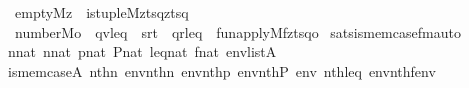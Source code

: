 \begin{isabellebody}
\ \ \ \ \ empty{\isacharparenleft}{\kern0pt}M{\isacharcomma}{\kern0pt}z{\isacharparenright}{\kern0pt}\ {\isasymand}\ is{\isacharunderscore}{\kern0pt}tuple{\isacharparenleft}{\kern0pt}M{\isacharcomma}{\kern0pt}z{\isacharcomma}{\kern0pt}t{}{\isacharcomma}{\kern0pt}s{\isacharcomma}{\kern0pt}q{\isacharcomma}{\kern0pt}zt{}sq{\isacharparenright}{\kern0pt}\ {\isasymand}\isanewline
\ \ \ \ \ number{}{\isacharparenleft}{\kern0pt}M{\isacharcomma}{\kern0pt}o{\isacharparenright}{\kern0pt}\ {\isasymand}\ qv{\isasymin}leq\ {\isasymand}\ sr{\isasymin}t{}\ {\isasymand}\ qr{\isasymin}leq\ {\isasymand}\ fun{\isacharunderscore}{\kern0pt}apply{\isacharparenleft}{\kern0pt}M{\isacharcomma}{\kern0pt}f{\isacharcomma}{\kern0pt}zt{}sq{\isacharcomma}{\kern0pt}o{\isacharparenright}{\kern0pt}{\isacharparenright}{\kern0pt}{\isachardoublequoteclose}\isanewline
\isanewline
\isanewline
{}\isamarkupfalse%
\ sats{\isacharunderscore}{\kern0pt}is{\isacharunderscore}{\kern0pt}mem{\isacharunderscore}{\kern0pt}case{\isacharunderscore}{\kern0pt}fm{\isacharunderscore}{\kern0pt}auto{\isacharcolon}{\kern0pt}\isanewline
\ \ \isanewline
\ \ \ \ {\isachardoublequoteopen}n{}{\isasymin}nat{\isachardoublequoteclose}\ {\isachardoublequoteopen}n{}{\isasymin}nat{\isachardoublequoteclose}\ {\isachardoublequoteopen}p{\isasymin}nat{\isachardoublequoteclose}\ {\isachardoublequoteopen}P{\isasymin}nat{\isachardoublequoteclose}\ {\isachardoublequoteopen}leq{\isasymin}nat{\isachardoublequoteclose}\ {\isachardoublequoteopen}f{\isasymin}nat{\isachardoublequoteclose}\ {\isachardoublequoteopen}env{\isasymin}list{\isacharparenleft}{\kern0pt}A{\isacharparenright}{\kern0pt}{\isachardoublequoteclose}\isanewline
\ \ \isanewline
\ \ \ \ {\isachardoublequoteopen}is{\isacharunderscore}{\kern0pt}mem{\isacharunderscore}{\kern0pt}case{\isacharparenleft}{\kern0pt}{\isacharhash}{\kern0pt}{\isacharhash}{\kern0pt}A{\isacharcomma}{\kern0pt}\ nth{\isacharparenleft}{\kern0pt}n{}{\isacharcomma}{\kern0pt}\ env{\isacharparenright}{\kern0pt}{\isacharcomma}{\kern0pt}nth{\isacharparenleft}{\kern0pt}n{}{\isacharcomma}{\kern0pt}\ env{\isacharparenright}{\kern0pt}{\isacharcomma}{\kern0pt}nth{\isacharparenleft}{\kern0pt}p{\isacharcomma}{\kern0pt}\ env{\isacharparenright}{\kern0pt}{\isacharcomma}{\kern0pt}nth{\isacharparenleft}{\kern0pt}P{\isacharcomma}{\kern0pt}\ env{\isacharparenright}{\kern0pt}{\isacharcomma}{\kern0pt}\ nth{\isacharparenleft}{\kern0pt}leq{\isacharcomma}{\kern0pt}\ env{\isacharparenright}{\kern0pt}{\isacharcomma}{\kern0pt}nth{\isacharparenleft}{\kern0pt}f{\isacharcomma}{\kern0pt}env{\isacharparenright}{\kern0pt}{\isacharparenright}{\kern0pt}\isanewline

\end{isabellebody}
